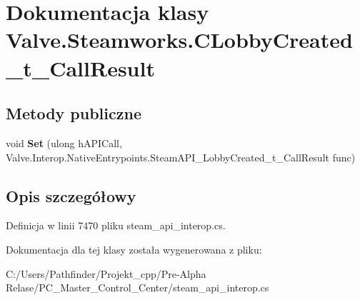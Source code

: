 \hypertarget{class_valve_1_1_steamworks_1_1_c_lobby_created__t___call_result}{}\section{Dokumentacja klasy Valve.\+Steamworks.\+C\+Lobby\+Created\+\_\+t\+\_\+\+Call\+Result}
\label{class_valve_1_1_steamworks_1_1_c_lobby_created__t___call_result}
\subsection*{Metody publiczne}
\begin{DoxyCompactItemize}
\item 
\mbox{\label{class_valve_1_1_steamworks_1_1_c_lobby_created__t___call_result_ac1272d51228906d24224ec612888dd4a}} 
void {\bfseries Set} (ulong h\+A\+P\+I\+Call, Valve.\+Interop.\+Native\+Entrypoints.\+Steam\+A\+P\+I\+\_\+\+Lobby\+Created\+\_\+t\+\_\+\+Call\+Result func)
\end{DoxyCompactItemize}


\subsection{Opis szczegółowy}


Definicja w linii 7470 pliku steam\+\_\+api\+\_\+interop.\+cs.



Dokumentacja dla tej klasy została wygenerowana z pliku\+:\begin{DoxyCompactItemize}
\item 
C\+:/\+Users/\+Pathfinder/\+Projekt\+\_\+cpp/\+Pre-\/\+Alpha Relase/\+P\+C\+\_\+\+Master\+\_\+\+Control\+\_\+\+Center/steam\+\_\+api\+\_\+interop.\+cs\end{DoxyCompactItemize}
